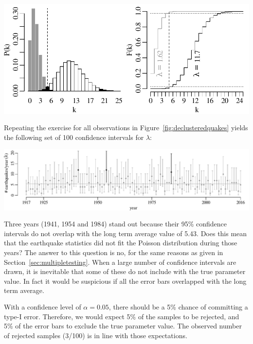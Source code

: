 \noindent\begin{minipage}[t][][b]{.6\textwidth}
  \includegraphics[width=\textwidth]{../figures/poisci.pdf}\medskip
\end{minipage}
\begin{minipage}[t][][t]{.4\textwidth}
  \label{fig:poisci}
\end{minipage}

Repeating the exercise for all observations in
Figure~\ref{fig:declusteredquakes} yields the following set of 100
confidence intervals for $\lambda$:\medskip

\noindent\includegraphics[width=\textwidth]{../figures/poiserrbars.pdf}
\begingroup {}
\endgroup

Three years (1941, 1954 and 1984) stand out because their 95\%
confidence intervals do not overlap with the long term average value
of 5.43. Does this mean that the earthquake statistics did not fit the
Poisson distribution during those years? The answer to this question
is no, for the same reasons as given in
Section~\ref{sec:multipletesting}. When a large number of confidence
intervals are drawn, it is inevitable that some of these do not
include with the true parameter value. In fact it would be suspicious
if all the error bars overlapped with the long term average.\medskip

With a confidence level of $\alpha=0.05$, there should be a 5\%
chance of committing a type-I error.  Therefore, we would expect 5\%
of the samples to be rejected, and 5\% of the error bars to exclude
the true parameter value. The observed number of rejected samples
(3/100) is in line with those expectations.
